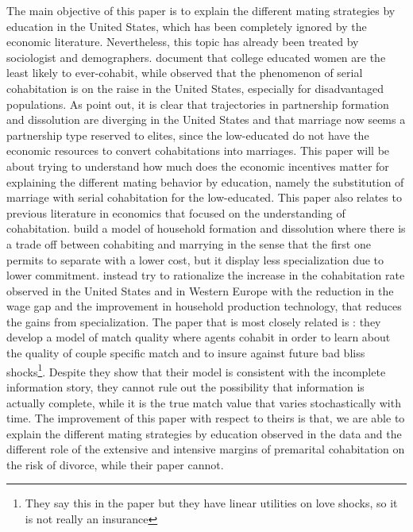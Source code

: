 \documentclass[12pt]{article}
\begin{document}
The main objective of this paper is to explain the different mating strategies by education in the United States, which has been completely ignored by  the economic literature. Nevertheless, this topic has already been treated by sociologist and demographers. \citet{bumpass2000} document that college educated women are the least likely to ever-cohabit, while \citet{lichter2010} observed that the phenomenon of serial cohabitation is on the raise in the United States, especially for disadvantaged populations. As \citet{perelli2016} point out, it is clear that trajectories in partnership formation and dissolution are diverging in the United States and that marriage now seems a partnership type reserved to elites, since the low-educated do not have the economic resources to convert cohabitations into marriages. This paper will be about trying to understand how much does the economic incentives matter for explaining the different mating behavior by education, namely the substitution of marriage with serial cohabitation for the low-educated.
This paper also relates to previous literature in economics that focused on the understanding of cohabitation. \citet{gemici2014} build a model of household formation and dissolution where there is a trade off between cohabiting and marrying in the sense that the first one permits to separate with a lower cost, but it display less specialization due to lower commitment. \citet{adamopoulou2010} instead try to rationalize the increase in the cohabitation rate observed in the United States and in Western Europe with the reduction in the wage gap and the improvement in household production technology, that reduces the gains from specialization.
The paper that is most closely related is  \citet{brien2006}: they develop a model of match quality where agents cohabit in order to learn about the quality of couple specific match and to insure against future bad bliss shocks\footnote{They say this in the paper but they have linear utilities on love shocks, so it is not really an insurance}. Despite they show that their model is consistent with the incomplete information story, they cannot rule out the possibility that information is actually complete, while it is the true match value that varies stochastically with time. The improvement of this paper with respect to theirs is that, we are able to explain the different mating strategies by education observed in the data and the different role of the extensive and intensive margins of premarital cohabitation on the risk of divorce, while their paper cannot.
\end{document}
